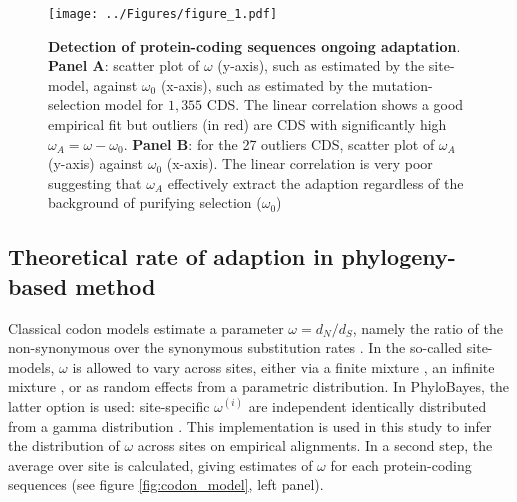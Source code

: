 \documentclass[10pt]{article}
\begin{document}
\begin{multicols}{2}
	\begin{figure*}[hb!]
	\begin{mdframed}
		\centering
		\texttt{[image: ../Figures/figure\_1.pdf]}\\
		\caption{ \textbf{Detection of protein-coding sequences ongoing adaptation}. \textbf{Panel A}: scatter plot of $\omega$ (y-axis), such as estimated by the site-model, against $\omega_{0}$ (x-axis), such as estimated by the mutation-selection model for $1,355$ CDS. The linear correlation shows a good empirical fit but outliers (in red) are CDS with significantly high $\omega_A = \omega - \omega_{0}$.  \textbf{Panel B}: for the 27 outliers CDS, scatter plot of $\omega_A$ (y-axis) against $\omega_{0}$ (x-axis). The linear correlation is very poor suggesting that $\omega_A$ effectively extract the adaption regardless of the background of purifying selection ($\omega_0$)  \label{fig:omega_pb}}
	\end{mdframed}
	\end{figure*}


	\subsection*{Theoretical rate of adaption in phylogeny-based method }
	Classical codon models estimate a parameter $\omega=d_N/d_S$, namely the ratio of the non-synonymous over the synonymous substitution rates \cite{Muse1994,Goldman1994}. In the so-called site-models, $\omega$ is allowed to vary across sites, either via a finite mixture \cite{Yang2001}, an infinite mixture \cite{Huelsenbeck2006}, or as random effects from a parametric distribution. In PhyloBayes, the latter option is used: site-specific $\omega^{(i)}$ are independent identically distributed from a gamma distribution \cite{lartillot_phylobayes_2013}. This implementation is used in this study to infer the distribution of $\omega$ across sites on empirical alignments. In a second step, the average over site is calculated, giving estimates of $\omega$ for each protein-coding sequences (see figure \ref{fig:codon_model}, left panel).  \\
	

\end{multicols}
\end{document}
